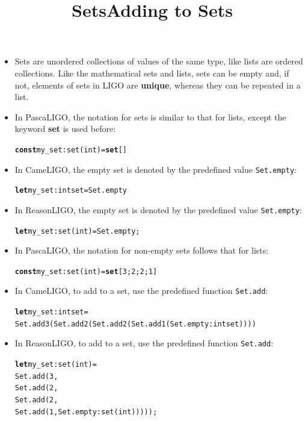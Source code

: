 \documentclass[wide]{slides}
\newcommand{\Kconst}[0]{\textbf{const}\xspace}
\newcommand{\Kset}[0]{\textbf{set}\xspace}
\newcommand{\Klet}[0]{\textbf{let}\xspace}
\begin{document}
\begin{slide}
  \title{Sets}

  \begin{itemize}

    \item Sets are unordered collections of values of the same type,
      like lists are ordered collections. Like the mathematical sets
      and lists, sets can be empty and, if not, elements of sets in
      LIGO are \textbf{unique}, whereas they can be repeated in a
      list.

    \item In PascaLIGO, the notation for sets is similar to that for
      lists, except the keyword \textbf{set} is used before:
      \begin{alltt}
\Kconst my_set : set (int) = \Kset []
      \end{alltt}

    \item In CameLIGO, the empty set is denoted by the predefined
      value \texttt{Set.empty}:
      \begin{alltt}
\Klet my_set : int set = Set.empty
      \end{alltt}

    \item In ReasonLIGO, the empty set is denoted by the predefined
      value \texttt{Set.empty}:
      \begin{alltt}
\Klet my_set : set (int) = Set.empty;
      \end{alltt}

  \end{itemize}

\end{slide}

\begin{slide}
  \title{Adding to Sets}

  \begin{itemize}

    \item In PascaLIGO, the notation for non-empty sets follows that
      for lists:
      \begin{alltt}
\Kconst my_set : set (int) = \Kset [3; 2; 2; 1]
      \end{alltt}

    \item In CameLIGO, to add to a set, use the predefined function
      \texttt{Set.add}:
      \begin{alltt}
\Klet my_set : int set =
  Set.add 3 (Set.add 2 (Set.add 2 (Set.add 1 (Set.empty : int set))))
      \end{alltt}

    \item In ReasonLIGO, to add to a set, use the predefined function
      \texttt{Set.add}:
      \begin{alltt}
\Klet my_set : set (int) =
  Set.add (3,
             Set.add (2,
                        Set.add (2,
                                   Set.add (1, Set.empty : set (int)))));
      \end{alltt}

  \end{itemize}

\end{slide}
\end{document}
